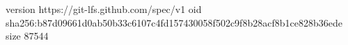 version https://git-lfs.github.com/spec/v1
oid sha256:b87d09661d0ab50b33c6107c4fd157430058f502c9f8b28acf8b1ce828b36ede
size 87544
